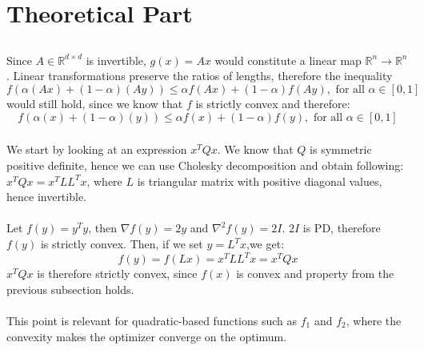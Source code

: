 \documentclass[a4paper]{article}
\begin{document}

\section{Theoretical Part}
\subsection{}
\subsubsection{}
Since $A \in \mathbb{R}^{d\times d}$ is invertible, $g(x) = Ax$ would constitute a linear map
$\mathbb{R}^n \rightarrow \mathbb{R}^n$. Linear transformations preserve the
ratios of lengths, therefore the inequality
\[
f(\alpha(A x)+(1-\alpha)(A y)) \leq \alpha f(A x)+(1-\alpha) f(A y), \text { for all } \alpha \in[0,1]
\]
would still hold, since we know that $f$ is strictly convex and therefore:
\[
f(\alpha(x)+(1-\alpha)(y)) \leq \alpha f(x)+(1-\alpha) f(y), \text { for all } \alpha \in[0,1]
\]
\subsubsection{}
We start by looking at an expression $x^TQx$. We know that $Q$ is symmetric
positive definite, hence we can use Cholesky decomposition and obtain following:
$x^TQx = x^TLL^Tx$, where $L$ is triangular matrix with positive diagonal
values, hence invertible.\\\\
Let $f(y) = y^Ty$, then $\nabla f(y) = 2y$ and $\nabla^2 f(y) = 2I$. $2I$ is
PD, therefore $f(y)$ is strictly convex. Then, if we set $y=L^Tx$,we get:
\[
f(y) = f(Lx) = x^TLL^Tx = x^TQx
\]
$x^TQx$ is therefore strictly convex, since $f(x)$ is convex and 
property from the previous subsection holds. \\\\
This point is relevant for quadratic-based functions such as $f_1$ and $f_2$,
where the convexity makes the optimizer converge on the optimum.

\subsection{}
\end{document}

